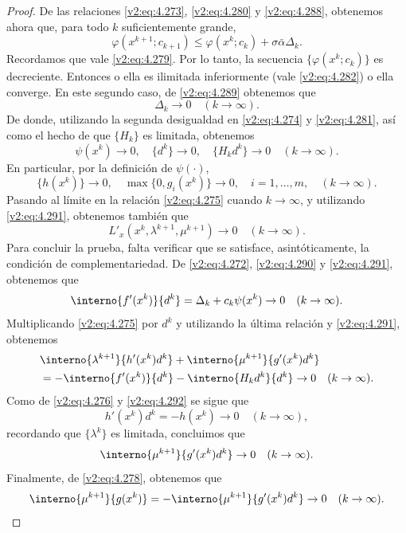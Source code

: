 \begin{proof}
De las relaciones \eqref{v2:eq:4.273}, \eqref{v2:eq:4.280} y \eqref{v2:eq:4.288}, obtenemos ahora que, para todo $k$ suficientemente grande,
\begin{equation}
\varphi(x^{k+1}; c_{k+1}) \le \varphi(x^k; c_k) + \sigma \bar{\alpha} \Delta_k.
\label{v2:eq:4.289}
\end{equation}
Recordamos que vale \eqref{v2:eq:4.279}. Por lo tanto, la secuencia $\{\varphi(x^k; c_k)\}$ es decreciente. Entonces o ella es ilimitada inferiormente (vale \eqref{v2:eq:4.282}) o ella converge. En este segundo caso, de \eqref{v2:eq:4.289} obtenemos que
\begin{equation}
\Delta_k \to 0 \quad (k \to \infty).
\label{v2:eq:4.290}
\end{equation}
De donde, utilizando la segunda desigualdad en \eqref{v2:eq:4.274} y \eqref{v2:eq:4.281}, así como el hecho de que $\{H_k\}$ es limitada, obtenemos
\begin{equation}
\psi(x^k) \to 0, \quad \{d^k\} \to 0, \quad \{H_k d^k\} \to 0 \quad (k \to \infty).
\label{v2:eq:4.291}
\end{equation}
En particular, por la definición de $\psi(\cdot)$,
\begin{equation}
\{h(x^k)\} \to 0, \quad \max\{0, g_i(x^k)\} \to 0, \quad i = 1, \dots, m, \quad (k \to \infty).
\label{v2:eq:4.292}
\end{equation}
Pasando al límite en la relación \eqref{v2:eq:4.275} cuando $k \to \infty$, y utilizando \eqref{v2:eq:4.291}, obtenemos también que
\[
L'_x(x^k, \lambda^{k+1}, \mu^{k+1}) \to 0 \quad (k \to \infty).
\]
Para concluir la prueba, falta verificar que se satisface, asintóticamente, la condición de complementariedad. De \eqref{v2:eq:4.272}, \eqref{v2:eq:4.290} y \eqref{v2:eq:4.291}, obtenemos que
\[
\interno{f'(x^k)}{d^k} = \Delta_k + c_k \psi(x^k) \to 0 \quad (k \to \infty).
\]
Multiplicando \eqref{v2:eq:4.275} por $d^k$ y utilizando la última relación y \eqref{v2:eq:4.291}, obtenemos
\begin{align*}
&\interno{\lambda^{k+1}}{h'(x^k)d^k} + \interno{\mu^{k+1}}{g'(x^k)d^k} \\
&= -\interno{f'(x^k)}{d^k} - \interno{H_k d^k}{d^k} \to 0 \quad (k \to \infty).
\end{align*}
Como de \eqref{v2:eq:4.276} y \eqref{v2:eq:4.292} se sigue que
\[
h'(x^k)d^k = -h(x^k) \to 0 \quad (k \to \infty),
\]
recordando que $\{\lambda^k\}$ es limitada, concluimos que
\[
\interno{\mu^{k+1}}{g'(x^k)d^k} \to 0 \quad (k \to \infty).
\]
Finalmente, de \eqref{v2:eq:4.278}, obtenemos que
\[
\interno{\mu^{k+1}}{g(x^k)} = -\interno{\mu^{k+1}}{g'(x^k)d^k} \to 0 \quad (k \to \infty).
\]
\end{proof}

